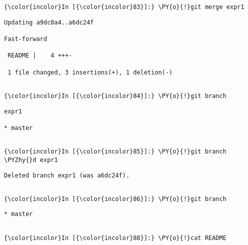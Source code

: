     \begin{Verbatim}[commandchars=\\\{\}]
{\color{incolor}In [{\color{incolor}83}]:} \PY{o}{!}git merge expr1
\end{Verbatim}

    \begin{Verbatim}[commandchars=\\\{\}]
Updating a9dc0a4..a6dc24f

Fast-forward

 README |    4 +++-

 1 file changed, 3 insertions(+), 1 deletion(-)


    \end{Verbatim}

    \begin{Verbatim}[commandchars=\\\{\}]
{\color{incolor}In [{\color{incolor}84}]:} \PY{o}{!}git branch 
\end{Verbatim}

    \begin{Verbatim}[commandchars=\\\{\}]
  expr1

* master


    \end{Verbatim}



    \begin{Verbatim}[commandchars=\\\{\}]
{\color{incolor}In [{\color{incolor}85}]:} \PY{o}{!}git branch \PYZhy{}d expr1
\end{Verbatim}

    \begin{Verbatim}[commandchars=\\\{\}]
Deleted branch expr1 (was a6dc24f).


    \end{Verbatim}

    \begin{Verbatim}[commandchars=\\\{\}]
{\color{incolor}In [{\color{incolor}86}]:} \PY{o}{!}git branch
\end{Verbatim}

    \begin{Verbatim}[commandchars=\\\{\}]
* master


    \end{Verbatim}

    \begin{Verbatim}[commandchars=\\\{\}]
{\color{incolor}In [{\color{incolor}88}]:} \PY{o}{!}cat README
\end{Verbatim}

